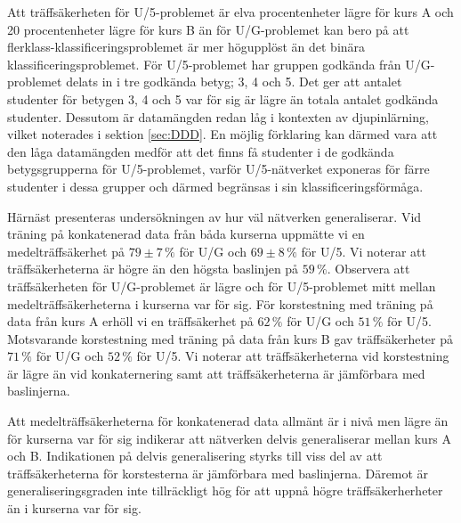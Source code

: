Att träffsäkerheten för U/5-problemet är elva procentenheter lägre för kurs A och 20 procentenheter lägre för kurs B än för U/G-problemet kan bero på att flerklass-klassificeringsproblemet är mer högupplöst än det binära klassificeringsproblemet. För U/5-problemet har gruppen godkända från U/G-problemet delats in i tre godkända betyg; 3, 4 och 5. Det ger att antalet studenter för betygen 3, 4 och 5 var för sig är lägre än totala antalet godkända studenter. Dessutom är datamängden redan låg i kontexten av djupinlärning, vilket noterades i sektion \ref{sec:DDD}. En möjlig förklaring kan därmed vara att den låga datamängden medför att det finns få studenter i de godkända betygsgrupperna för U/5-problemet, varför U/5-nätverket exponeras för färre studenter i dessa grupper och därmed begränsas i sin klassificeringsförmåga.

Härnäst presenteras undersökningen av hur väl nätverken generaliserar. Vid träning på konkatenerad data från båda kurserna uppmätte vi en medelträffsäkerhet på $79\pm7\, \%$ för U/G och $69\pm8 \, \% $ för U/5. Vi noterar att träffsäkerheterna är högre än den högsta baslinjen på $59 \, \%$. Observera att träffsäkerheten för U/G-problemet är lägre och för U/5-problemet mitt mellan medelträffsäkerheterna i kurserna var för sig. För korstestning med träning på data från kurs A erhöll vi en träffsäkerhet på $62 \, \% $ för U/G och $51 \, \%$ för U/5. Motsvarande korstestning med träning på data från kurs B gav träffsäkerheter på $71\, \%$ för U/G och $52 \, \%$ för U/5. Vi noterar att träffsäkerheterna vid korstestning är lägre än vid konkaternering samt att träffsäkerheterna är jämförbara med baslinjerna.

Att medelträffsäkerheterna för konkatenerad data allmänt är i nivå men lägre än för kurserna var för sig indikerar att nätverken delvis generaliserar mellan kurs A och B. Indikationen på delvis generalisering styrks till viss del av att träffsäkerheterna för korstesterna är jämförbara med baslinjerna. Däremot är generaliseringsgraden inte tillräckligt hög för att uppnå högre träffsäkerherheter än i kurserna var för sig. 




